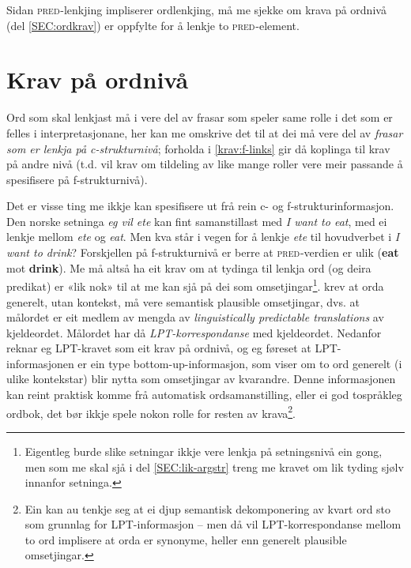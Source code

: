 \documentclass[12pt,a4paper,oneside,draft]{report}
\newcommand{\F}[2]{\textsc{#1}\ensuremath{_{#2}}}
\newcommand{\PRED}{\F{pred}{}}
\begin{document}
Sidan \PRED{}-lenkjing impliserer ordlenkjing, må me sjekke om krava
 på ordnivå (del \ref{SEC:ordkrav}) er oppfylte for å lenkje to
 \PRED{}-element.

\section{Krav på ordnivå}
\label{sec-3.5}

\label{SEC:ordkrav}

Ord som skal lenkjast må i \cite{thunes2003eal} vere del av frasar som
speler same rolle i det som er felles i interpretasjonane, her kan me
omskrive det til at dei må vere del av \emph{frasar som er lenkja på c-strukturnivå}; forholda i \ref{krav:f-links} gir då koplinga til krav på
andre nivå (t.d. vil krav om tildeling av like mange roller vere
meir passande å spesifisere på f-strukturnivå).

Det er visse ting me ikkje kan spesifisere ut frå rein c- og
 f-strukturinformasjon. Den norske setninga \emph{eg vil ete} kan fint
 samanstillast med \emph{I want to eat}, med ei lenkje mellom \emph{ete} og
 \emph{eat}. Men kva står i vegen for å lenkje \emph{ete} til hovudverbet i \emph{I  want to drink}? Forskjellen på f-strukturnivå er berre at
 \PRED{}-verdien er ulik (\textbf{eat} mot \textbf{drink}). Me må altså ha eit krav
 om at tydinga til lenkja ord (og deira predikat) er «lik nok» til at
 me kan sjå på dei som omsetjingar\footnote{Eigentleg burde slike setningar ikkje vere lenkja på
        setningsnivå ein gong, men som me skal sjå i del
        \ref{SEC:lik-argstr} treng me kravet om lik tyding 
        sjølv innanfor setninga. }. \citet[s.~74]{dyvik2009lmp}
 krev at orda generelt, utan kontekst, må vere semantisk plausible
 omsetjingar, dvs. at målordet er eit medlem av mengda av
 \emph{linguistically predictable translations} av kjeldeordet. Målordet
 har då \emph{LPT-korrespondanse} med kjeldeordet.  Nedanfor reknar eg
 LPT-kravet som eit krav på ordnivå, og eg føreset at
 LPT-informasjonen er ein type bottom-up-informasjon, som viser om to
 ord generelt (i ulike kontekstar) blir nytta som omsetjingar av
 kvarandre. Denne informasjonen kan reint praktisk komme frå
 automatisk ordsamanstilling, eller ei god tospråkleg ordbok, det bør
 ikkje spele nokon rolle for resten av krava\footnote{Ein kan au tenkje seg at ei djup semantisk dekomponering av
        kvart ord sto som grunnlag for LPT-informasjon -- men då vil
        LPT-korrespondanse mellom to ord implisere at orda er
        synonyme, heller enn generelt plausible omsetjingar. }.
\end{document}
